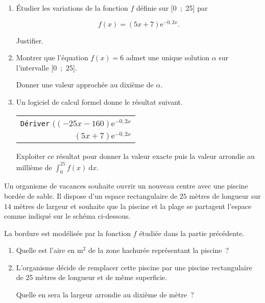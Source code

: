 \bigbreak
{}
\medbreak
\begin{enumerate}
     \item Étudier les variations de la fonction $f$ définie sur [0~;~25] par
     \par
     \[f(x) = (5x + 7)\text{e}^{- 0,2x}.\]
     \par
     Justifier.
     \item  Montrer que l'équation $f(x) = 6$ admet une unique solution $\alpha$ sur l'intervalle [0~;~25].
     \par
     Donner une valeur approchée au dixième de $\alpha$.
     \item  Un logiciel de calcul formel donne le résultat suivant.
     \par
     \begin{center}
          \begin{extern}%
               \renewcommand\arraystretch{1.8}
               \begin{tabularx}{0.5\linewidth}{|X|}\hline%
                    \texttt{Dériver} $((- 25x - 160)\text{e}^{- 0,2x}$\\
                    \multicolumn{1}{|r|}{$(5x + 7)\text{e}^{- 0,2x}$}\\ \hline
               \end{tabularx}
          \end{extern}
     \end{center}
     Exploiter ce résultat pour donner la valeur exacte puis la valeur arrondie au millième de
     $\displaystyle\int_0^{25} f(x)\:\text{d}x$.
\end{enumerate}
\bigbreak
{}
\medbreak
Un organisme de vacances souhaite ouvrir un nouveau centre avec une piscine bordée de
sable. Il dispose d'un espace rectangulaire de $25$ mètres de longueur sur $14$ mètres de
largeur et souhaite que la piscine et la \og plage \fg se partagent l'espace comme indiqué sur le schéma ci-dessous.
\par
La bordure est modélisée par la fonction $f$ étudiée dans la partie précédente.
\medbreak
\begin{enumerate}
     \item Quelle est l'aire en m$^2$ de la zone hachurée représentant la piscine~?
     \item L'organisme décide de remplacer cette piscine par une piscine rectangulaire de 25
     mètres de longueur et de même superficie.
     \par
     Quelle en sera la largeur arrondie au dixième de mètre~?
\end{enumerate}
